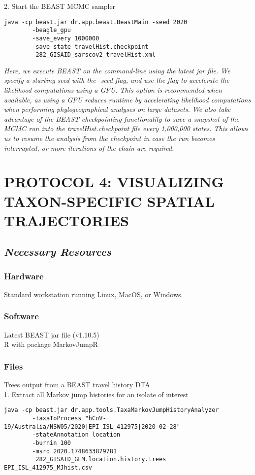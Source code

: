 \documentclass{article}
\newcommand{\ann}[1]{
\begin{adjustwidth}{0.5cm}{}
\it{#1}\\
\end{adjustwidth}}
\newcommand{\code}[1]{
{\upshape\ttfamily{#1}}}
\begin{document}
2. Start the BEAST MCMC sampler
\begin{verbatim}
java -cp beast.jar dr.app.beast.BeastMain -seed 2020  
        -beagle_gpu
        -save_every 1000000
        -save_state travelHist.checkpoint
         282_GISAID_sarscov2_travelHist.xml
\end{verbatim}

\ann{Here, we execute BEAST on the command-line using the latest jar file. We specify a starting seed with the -seed flag, and use the \code{-beagle\_cuda} flag to accelerate the likelihood computations using a GPU. This option is recommended when available, as using a GPU reduces runtime by accelerating likelihood computations when performing phylogeographical analyses on large datasets. We also take advantage of the BEAST checkpointing functionality to save a snapshot of the MCMC run into the travelHist.checkpoint file every 1,000,000 states. This allows us to resume the analysis from the checkpoint in case the run becomes interrupted, or more iterations of the chain are required.}

\section*{PROTOCOL 4: VISUALIZING TAXON-SPECIFIC SPATIAL TRAJECTORIES}
\subsection*{\textbf{\textit{Necessary Resources}}}
\subsubsection*{Hardware}
Standard workstation running Linux, MacOS, or Windows. 

\subsubsection*{Software}
Latest BEAST jar file (v1.10.5)\\
R with package MarkovJumpR

\subsubsection*{Files}
Trees output from a BEAST travel history DTA \\

1. Extract all Markov jump histories for an isolate of interest
\begin{verbatim}
java -cp beast.jar dr.app.tools.TaxaMarkovJumpHistoryAnalyzer 
        -taxaToProcess "hCoV-19/Australia/NSW05/2020|EPI_ISL_412975|2020-02-28" 
        -stateAnnotation location
        -burnin 100
        -msrd 2020.1748633879781
         282_GISAID_GLM.location.history.trees EPI_ISL_412975_MJhist.csv
\end{verbatim}
\end{document}
